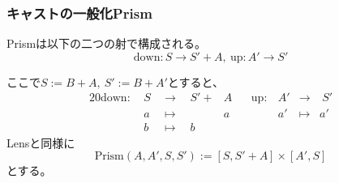 \documentclass[uplatex,dvipdfmx]{beamer}
\newcommand{\arrow}{\rightarrow}
\newcommand{\tuple}[1]{\langle #1\rangle}
\newcommand{\mor}[3]{#1:#2\arrow #3}
\newcommand{\inset}[2]{[#1,#2]}
\begin{document}
  \begin{frame}\frametitle{キャストの一般化Prism}
    \begin{definition}[Prism]
      Prismは以下の二つの射で構成される。
      \[\mor{\mathrm{down}}{S}{S' + A},\ \mor{\mathrm{up}}{A'}{S'}\]
    \end{definition}
    ここで$S:=B+ A,\ S':=B+ A'$とすると、
    \begin{alignat*}{20}
      \mathrm{down}:\ &S\ \ &\longrightarrow \ \ &S'+&A & \ \ \ \ \mathrm{up}: &A'&\longrightarrow &\ S'\\
      &a \ \ &\longmapsto \ \ &&a &&a'&\longmapsto &a'\\
      &b \ \ &\longmapsto \ \ &b& &
    \end{alignat*}
    Lensと同様に\[\mathrm{Prism}(A,A',S,S') := \inset{S}{S'+A}\times\inset{A'}{S}\]とする。
  \end{frame}


\end{document}
